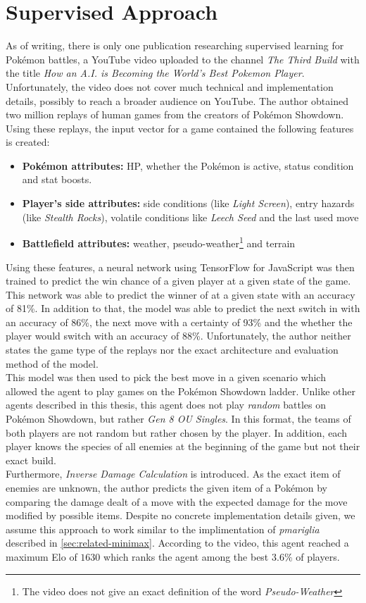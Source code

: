 \section{Supervised Approach}
As of writing, there is only one publication researching supervised learning for Pokémon battles,
a YouTube video uploaded to the channel \grqq\emph{The Third Build}\grqq{} with the title \grqq\emph{How an A.I. is
Becoming the World's Best Pokemon Player}\grqq{}\cite{TheThirdBuild:PokemonAI}.
Unfortunately, the video does not cover much technical and implementation details, possibly to reach a 
broader audience on YouTube.
The author obtained two million 
replays of human games from the creators of Pokémon Showdown. Using these replays, the input vector for a game
contained the following features is created:
\begin{itemize}
    \item \textbf{Pokémon attributes:} \ac{HP}, whether the Pokémon is active, status condition and stat boosts.
    \item \textbf{Player's side attributes:} side conditions (like \textit{Light Screen}), entry hazards 
    (like \textit{Stealth Rocks}), volatile conditions like \textit{Leech Seed} and the last used move
    \item \textbf{Battlefield attributes:} weather, pseudo-weather\footnote{The video does not give an exact 
    definition of the word \textit{Pseudo-Weather}} and terrain
\end{itemize}
Using these features, a neural network using TensorFlow for JavaScript was then trained to predict the 
win chance of a given player at a given state of the game. This network was able to predict the winner
of at a given state with an accuracy of 81\%. In addition to that, the model was able to predict the next
switch in with an accuracy of 86\%, the next move with a certainty of 93\% and the whether the
player would switch with an accuracy of 88\%. Unfortunately, the author neither states the game type of
the replays nor the exact architecture and evaluation method of the model. \\
This model was then used to pick the best move in a given scenario which allowed the agent to play games
on the Pokémon Showdown ladder. Unlike other agents described in this thesis, this agent does not play
\emph{random} battles on Pokémon Showdown, but rather \emph{Gen 8 OU Singles}. In this format, the 
teams of both players are not random but rather chosen by the player. In addition, each player knows
the species of all enemies at the beginning of the game but not their exact build. \\
Furthermore, \textit{Inverse Damage Calculation} is introduced. As the exact item of 
enemies are unknown, the author predicts the given item of a Pokémon by comparing the damage dealt
of a move with the expected damage for the move modified by possible items. Despite no concrete 
implementation details given, we assume this approach to work similar to the implimentation 
of \emph{pmariglia} described in \ref{sec:related-minimax}.
According to the video, this agent reached a maximum Elo of $1630$ which ranks the agent among the 
best $3.6\%$ of players.